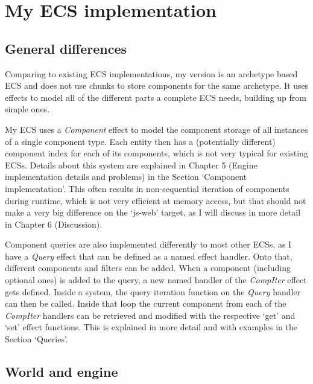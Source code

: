 \chapter{My ECS implementation}\label{chap:ecs}

\section{General differences}

Comparing to existing ECS implementations, my version is an archetype based ECS and does not use chunks to store components for the same archetype. It uses effects to model all of the different parts a complete ECS needs, building up from simple ones.

My ECS uses a \textit{Component} effect to model the component storage of all instances of a single component type. Each entity then has a (potentially different) component index for each of its components, which is not very typical for existing ECSs. Details about this system are explained in Chapter 5 (Engine implementation details and problems) in the Section `Component implementation'. This often results in non-sequential iteration of components during runtime, which is not very efficient at memory access, but that should not make a very big difference on the `js-web' target, as I will discuss in more detail in Chapter 6 (Discussion).

Component queries are also implemented differently to most other ECSs, as I have a \textit{Query} effect that can be defined as a named effect handler. Onto that, different components and filters can be added. When a component (including optional ones) is added to the query, a new named handler of the \textit{CompIter} effect gets defined. Inside a system, the query iteration function on the \textit{Query} handler can then be called. Inside that loop the current component from each of the \textit{CompIter} handlers can be retrieved and modified with the respective `get' and `set' effect functions. This is explained in more detail and with examples in the Section `Queries'.

\section{World and engine}

